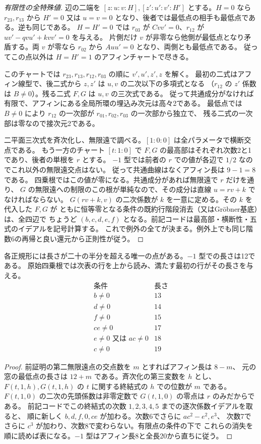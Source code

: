 \begin{proof}[有限性の全特殊値]
辺の二端を $[z:u:v:H],[z':u':v':H']$ とする。$H=0$ なら $r_{23},r_{13}$ から
$H'=0$ 又は $u=v=0$ となり、後者では最低点の相手も最低点である。逆も同じである。
$H=H'=0$ では $r_{03}$ が $Cvv'=0$、$r_{12}$ が $uv'-qvu'+kvv'=0$ を与える。
片側だけ $v$ が非零なら他側が最低点となり矛盾する。両 $v$ が零なら
$r_{02}$ から $Auu'=0$ となり、両側とも最低点である。
従ってこの点以外は $H=H'=1$ のアフィンチャートで尽きる。

このチャートでは $r_{23},r_{13},r_{12},r_{03}$ の順に $v',u',z',z$ を解く。
最初の二式はアフィン線型で、後二式から $z,z'$ は $u,v$ の二次以下の多項式となる
（$r_{12}$ の $z'$ 係数は $B\ne0$）。残る二式 $F,G$ は $u,v$ の三次式である。
従って共通成分がなければ有限で、アフィンにある全局所環の埋込み次元は高々2である。
最低点では $B\ne0$ により $r_{12}$ の一次部が $r_{01},r_{02},r_{03}$ の一次部から独立で、
残る二式の一次部は零なので接次元2である。

二平面三次式を斉次化し、無限遠で調べる。$[1:0:0]$ は全パラメータで横断交点である。
もう一方のチャート $[t:1:0]$ で $F,G$ の最高部はそれぞれ次数2と1であり、後者の単根を $r$ とする。
$-1$ 型では前者の $r$ での値が各辺で $1/2$ なのでこれ以外の無限遠交点はない。
従って共通曲線はなくアフィン長は $9-1=8$ である。
四乗根ではこの値が零になる。共通成分があれば無限遠で $r$ だけを通り、
$G$ の無限遠への制限のこの根が単純なので、その成分は直線 $u=rv+k$ でなければならない。
$G(rv+k,v)$ の二次係数が $k$ を一意に定める。その $k$ を代入した $F,G$ が
ともに恒等零となる条件の既約行階段消去（又はGröbner基底）は、全四辺で
ちょうど $(b,c,d,e,f)$ となる。前記コードは最高部・横断性・五式のイデアルを記号計算する。
これで例外の全てが決まる。例外上でも同じ階数6の再帰と良い還元から正則性が従う。
\end{proof}

\begin{corollary}\label{cor:finite-quantum-planar-lengths}
各正規形には長さが二十の半分を超える唯一の点がある。$-1$ 型での長さは12である。
原始四乗根では次表の行を上から読み、満たす最初の行がその長さを与える。
\[
\begin{array}{c|c}
\text{条件}&\text{長さ}\\\hline
 b\ne0&13\\
 d\ne0&14\\
 f\ne0&15\\
 ce\ne0&17\\
 e\ne0\text{ 又は }ac\ne0&18\\
 c\ne0&19
\end{array}
\]
\end{corollary}
\begin{proof}
前証明の第二無限遠点の交点数を $m$ とすればアフィン長は $8-m$、
元の窓の最低点の長さは $12+m$ である。斉次化の第三変数を $h$ とし、
$F(t,1,h),G(t,1,h)$ の $t$ に関する終結式の $h$ での位数が $m$ である。
$F(t,1,0)$ の二次の先頭係数は非零定数で $G(t,1,0)$ の零点は $r$ のみだからである。
前記コードでこの終結式の次数 $1,2,3,4,5$ までの逐次係数イデアルを取ると、
順に新しく $b,d,f,0,ce$ が加わる。次数6でさらに $ac^2-e^2,e^3$、
次数7でさらに $c^3$ が加わり、次数8で変わらない。有限点の条件の下で
これらの消失を順に読めば表になる。$-1$ 型はアフィン長8と全長20から直ちに従う。
\end{proof}
